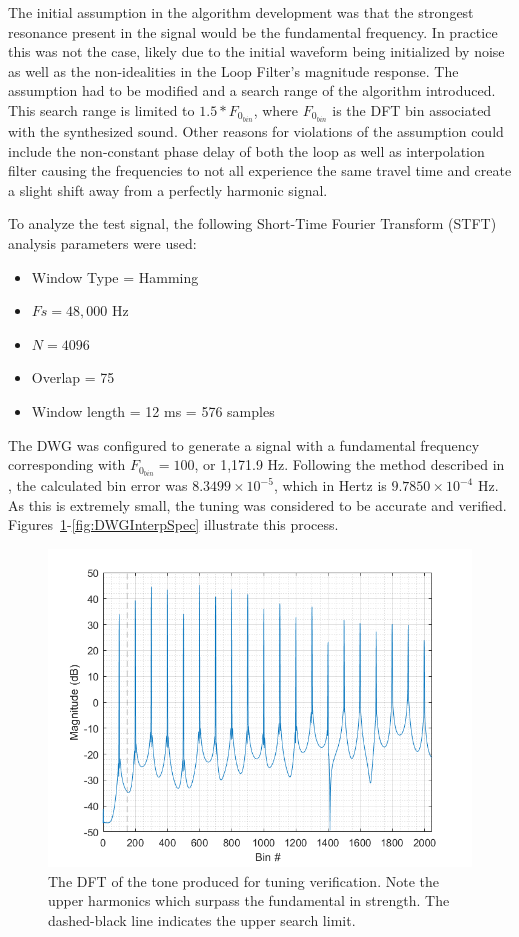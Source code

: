 \documentclass[../main.tex]{subfiles}
\begin{document}
The initial assumption in the algorithm development was that the strongest resonance present in the signal would be the fundamental frequency. In practice this was not the case, likely due to the initial waveform being initialized by noise as well as the non-idealities in the Loop Filter's magnitude response. The assumption had to be modified and a search range of the algorithm introduced. This search range is limited to $1.5*F_{0_{bin}}$, where $F_{0_{bin}}$ is the DFT bin associated with the synthesized sound. Other reasons for violations of the assumption could include the non-constant phase delay of both the loop as well as interpolation filter causing the frequencies to not all experience the same travel time and create a slight shift away from a perfectly harmonic signal.

To analyze the test signal, the following Short-Time Fourier Transform (STFT) analysis parameters were used:
\begin{itemize}
    \item Window Type = Hamming
    \item $Fs = 48,000$ Hz
    \item $N = 4096$
    \item Overlap = 75%
    \item Window length = 12 ms = 576 samples
\end{itemize}

The DWG was configured to generate a signal with a fundamental frequency corresponding with $F_{0_{bin}} = 100$, or 1,171.9 Hz. Following the method described in , the calculated bin error was $8.3499 \times 10^{-5}$, which in Hertz is $9.7850 \times 10^{-4}$ Hz. As this is extremely small, the tuning was considered to be accurate and verified. Figures~\ref{fig:DWGInterpBins}-\ref{fig:DWGInterpSpec} illustrate this process.

\begin{figure}[h]
    \centering
    \includegraphics[scale=.65]{./images/plots/StringDWGInterpBins.png}
    \caption{The DFT of the tone produced for tuning verification. Note the upper harmonics which surpass the fundamental in strength. The dashed-black line indicates the upper search limit.}
    \label{fig:DWGInterpBins}
\end{figure}
\end{document}
